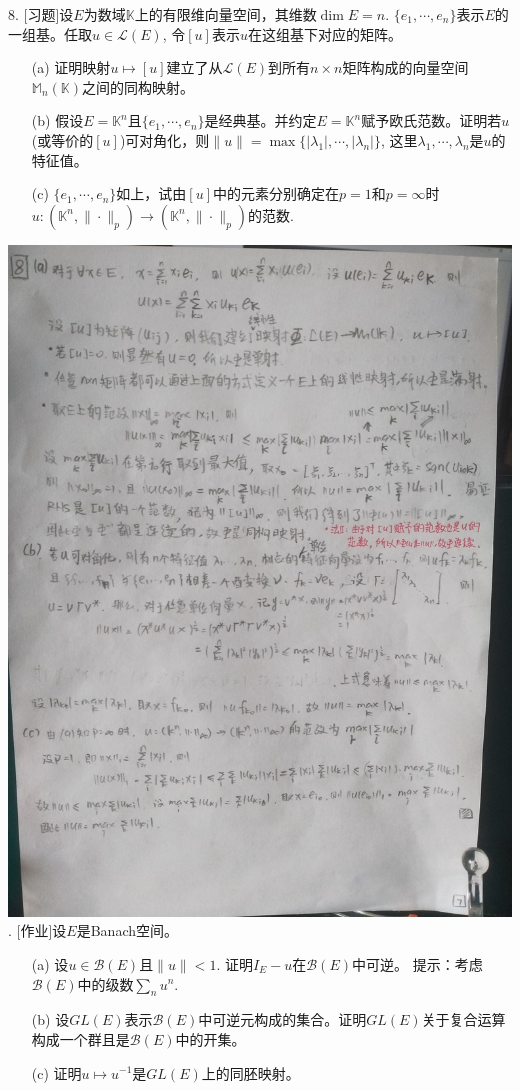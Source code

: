 \documentclass[a4paper,8pt]{ctexart}\textwidth 140mm \textheight 216mm
\newcommand{\8}{\infty}
\begin{document}
8. [习题]设$E$为数域$\mathbb{K}$上的有限维向量空间，其维数$\dim E=n$. $\{e_1,\cdots,e_n\}$表示$E$的一组基。任取$u\in\mathcal{L}(E)$, 令$[u]$表示$u$在这组基下对应的矩阵。
\begin{itemize}
	\item[(a)] 证明映射$u\mapsto[u]$建立了从$\mathcal{L}(E)$到所有$n\times n$矩阵构成的向量空间$\mathbb{M}_n(\mathbb{K})$之间的同构映射。
	\item[(b)] 假设$E=\mathbb{K}^n$且$\{e_1,\cdots,e_n\}$是经典基。并约定$E=\mathbb{K}^n$赋予欧氏范数。证明若$u$(或等价的$[u]$)可对角化，则$\|u\|=\max\{|\lambda_1|,\cdots,|\lambda_n|\}$, 这里$\lambda_1,\cdots,\lambda_n$是$u$的特征值。
	\item[(c)] $\{e_1,\cdots,e_n\}$如上，试由$[u]$中的元素分别确定在$p=1$和$p=\infty$时$u:(\mathbb{K}^n,\|\cdot\|_p)\to(\mathbb{K}^n,\|\cdot\|_p)$的范数.
\end{itemize}
\includegraphics[scale=0.18]{3_8.jpg}
. [作业]设$E$是Banach空间。
\begin{enumerate}
	\item[(a)] 设$u\in \mathcal{B}(E)$且$\|u\|< 1$. 证明$I_E-u$在$\mathcal{B}(E)$中可逆。
	提示：考虑$\mathcal{B}(E)$中的级数$\sum_{n}u^n$.
	\item[(b)] 设$GL(E)$表示$\mathcal{B}(E)$中可逆元构成的集合。证明$GL(E)$关于复合运算构成一个群且是$\mathcal{B}(E)$中的开集。
	\item[(c)] 证明$u\mapsto u^{-1}$是$GL(E)$上的同胚映射。
\end{enumerate}
\end{document}
